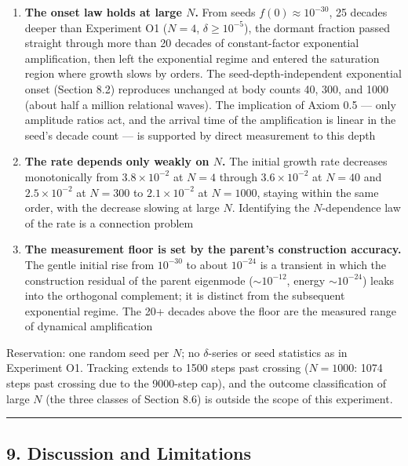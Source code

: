 \documentclass[
  a4paper,
]{article}
\providecommand{\tightlist}{%
  \setlength{\itemsep}{0pt}\setlength{\parskip}{0pt}}
\begin{document}
\begin{enumerate}
\def\labelenumi{\arabic{enumi}.}
\tightlist
\item
  \textbf{The onset law holds at large \(N\).} From seeds
  \(f(0)\approx10^{-30}\), 25 decades deeper than Experiment O1
  (\(N=4\), \(\delta\ge10^{-5}\)), the dormant fraction passed straight
  through more than 20 decades of constant-factor exponential
  amplification, then left the exponential regime and entered the
  saturation region where growth slows by orders. The
  seed-depth-independent exponential onset (Section 8.2) reproduces
  unchanged at body counts 40, 300, and 1000 (about half a million
  relational waves). The implication of Axiom 0.5 --- only amplitude
  ratios act, and the arrival time of the amplification is linear in the
  seed's decade count --- is supported by direct measurement to this
  depth
\item
  \textbf{The rate depends only weakly on \(N\).} The initial growth
  rate decreases monotonically from \(3.8\times10^{-2}\) at \(N=4\)
  through \(3.6\times10^{-2}\) at \(N=40\) and \(2.5\times10^{-2}\) at
  \(N=300\) to \(2.1\times10^{-2}\) at \(N=1000\), staying within the
  same order, with the decrease slowing at large \(N\). Identifying the
  \(N\)-dependence law of the rate is a connection problem
\item
  \textbf{The measurement floor is set by the parent's construction
  accuracy.} The gentle initial rise from \(10^{-30}\) to about
  \(10^{-24}\) is a transient in which the construction residual of the
  parent eigenmode (\(\sim10^{-12}\), energy \(\sim10^{-24}\)) leaks
  into the orthogonal complement; it is distinct from the subsequent
  exponential regime. The 20+ decades above the floor are the measured
  range of dynamical amplification
\end{enumerate}

Reservation: one random seed per \(N\); no \(\delta\)-series or seed
statistics as in Experiment O1. Tracking extends to 1500 steps past
crossing (\(N=1000\): 1074 steps past crossing due to the 9000-step
cap), and the outcome classification of large \(N\) (the three classes
of Section 8.6) is outside the scope of this experiment.

\begin{center}\rule{0.5\linewidth}{0.5pt}\end{center}

\subsection{9. Discussion and
Limitations}\label{discussion-and-limitations}
\end{document}

